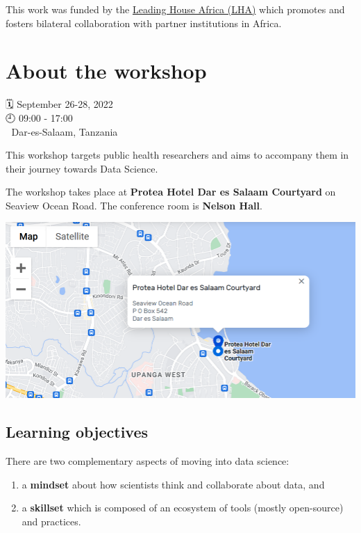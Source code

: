 \documentclass[
  letterpaper,
  DIV=11,
  numbers=noendperiod]{scrreprt}
\providecommand{\tightlist}{%
  \setlength{\itemsep}{0pt}\setlength{\parskip}{0pt}}\usepackage{longtable,booktabs,array}
\begin{document}
This work was funded by the
\href{https://www.swisstph.ch/en/research/leading-house-africa/}{Leading
House Africa (LHA)} which promotes and fosters bilateral collaboration
with partner institutions in Africa.


\hypertarget{about-the-workshop}{%
\chapter{About the workshop}\label{about-the-workshop}}

{🗓️} September 26-28, 2022\\
{🕘} 09:00 - 17:00\\
{🌇} Dar-es-Salaam, Tanzania

This workshop targets public health researchers and aims to accompany
them in their journey towards Data Science.

The workshop takes place at \textbf{Protea Hotel Dar es Salaam
Courtyard} on Seaview Ocean Road. The conference room is \textbf{Nelson
Hall}.

\includegraphics{./images/paste-67B4C38F.png}

\hypertarget{learning-objectives}{%
\section{Learning objectives}\label{learning-objectives}}

There are two complementary aspects of moving into data science:

\begin{enumerate}
\def\labelenumi{\arabic{enumi}.}
\tightlist
\item
  a \textbf{mindset} about how scientists think and collaborate about
  data, and
\item
  a \textbf{skillset} which is composed of an ecosystem of tools (mostly
  open-source) and practices.
\end{enumerate}
\end{document}
